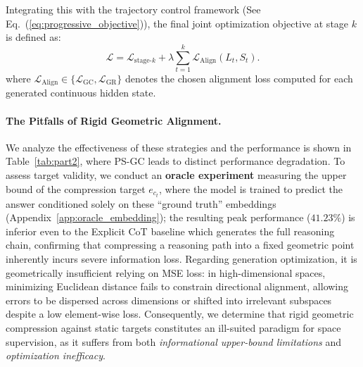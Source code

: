 Integrating this with the trajectory control framework (See Eq.~(\ref{eq:progressive_objective})), the final joint optimization objective at stage $k$ is defined as:
\begin{equation}
    \mathcal{L}
    =
    \mathcal{L}_{\text{stage-}k}
    +
    \lambda
    \sum_{t=1}^{k}
    \mathcal{L}_{\text{Align}}(L_t, S_t).
\end{equation}
where $\mathcal{L}_{\text{Align}} \in \{ \mathcal{L}_{\text{GC}}, \mathcal{L}_{\text{GR}} \}$ denotes the chosen alignment loss computed for each generated continuous hidden state.



\paragraph{The Pitfalls of Rigid Geometric Alignment.}
We analyze the effectiveness of these strategies and the performance is shown in Table~\ref{tab:part2}, where \textsc{PS-GC} leads to distinct performance degradation. 
To assess target validity, we conduct an \textbf{oracle experiment} measuring the upper bound of the compression target $e_{c_t}$, where the model is trained to predict the answer conditioned solely on these ``ground truth'' embeddings (Appendix~\ref{app:oracle_embedding}); the resulting peak performance ($41.23\%$) is inferior even to the Explicit CoT baseline which generates the full reasoning chain, confirming that compressing a reasoning path into a fixed geometric point inherently incurs severe information loss. 
Regarding generation optimization, it is geometrically insufficient relying on MSE loss: in high-dimensional spaces, minimizing Euclidean distance fails to constrain directional alignment, allowing errors to be dispersed across dimensions or shifted into irrelevant subspaces despite a low element-wise loss. Consequently, we determine that rigid geometric compression against static targets constitutes an ill-suited paradigm for space supervision, as it suffers from both \textit{informational upper-bound limitations} and \textit{optimization inefficacy}.

